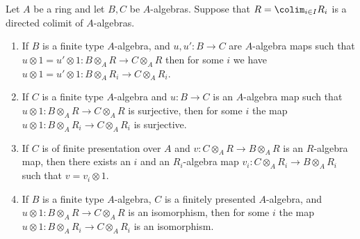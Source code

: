 \begin{lemma}
\label{lemma-algebra-map-property-in-colimit}
Let $A$ be a ring and let $B, C$ be $A$-algebras.
Suppose that $R = \colim_{i \in I} R_i$ is a directed colimit
of $A$-algebras.
\begin{enumerate}
\item If $B$ is a finite type $A$-algebra, and $u, u' : B \to C$ are
$A$-algebra maps such that
$u \otimes 1 = u' \otimes 1 : B \otimes_A R \to C \otimes_A R$
then for some $i$ we have
$u \otimes 1 = u' \otimes 1 : B \otimes_A R_i \to C \otimes_A R_i$.
\item If $C$ is a finite type $A$-algebra and $u : B \to C$ is an
$A$-algebra map such that
$u \otimes 1 : B \otimes_A R \to C \otimes_A R$ is surjective, then
for some $i$ the map $u \otimes 1 : B \otimes_A R_i \to C \otimes_A R_i$
is surjective.
\item If $C$ is of finite presentation over $A$ and
$v : C \otimes_A R \to B \otimes_A R$ is an $R$-algebra map, then there
exists an $i$ and an $R_i$-algebra map
$v_i : C \otimes_A R_i \to B \otimes_A R_i$ such that
$v = v_i \otimes 1$.
\item If $B$ is a finite type $A$-algebra, $C$ is a finitely presented
$A$-algebra, and
$u \otimes 1 : B \otimes_A R \to C \otimes_A R$ is an isomorphism, then
for some $i$ the map $u \otimes 1 : B \otimes_A R_i \to C \otimes_A R_i$
is an isomorphism.
\end{enumerate}
\end{lemma}

